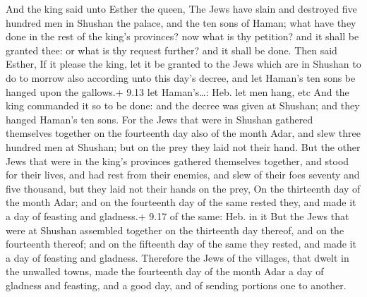  And the king said unto Esther the queen, The Jews have
slain and destroyed five hundred men in Shushan the palace, and the ten
sons of Haman; what have they done in the rest of the king's provinces?
now what is thy petition? and it shall be granted thee: or what is thy
request further? and it shall be done.  Then said Esther,
If it please the king, let it be granted to the Jews which are in
Shushan to do to morrow also according unto this day's decree, and let
Haman's ten sons be hanged upon the gallows.+ 9.13 let Haman's\ldots:
Heb. let men hang, etc  And the king commanded it so to be
done: and the decree was given at Shushan; and they hanged Haman's ten
sons.  For the Jews that were in Shushan gathered
themselves together on the fourteenth day also of the month Adar, and
slew three hundred men at Shushan; but on the prey they laid not their
hand.  But the other Jews that were in the king's provinces
gathered themselves together, and stood for their lives, and had rest
from their enemies, and slew of their foes seventy and five thousand,
but they laid not their hands on the prey,  On the
thirteenth day of the month Adar; and on the fourteenth day of the same
rested they, and made it a day of feasting and gladness.+ 9.17 of the
same: Heb. in it  But the Jews that were at Shushan
assembled together on the thirteenth day thereof, and on the fourteenth
thereof; and on the fifteenth day of the same they rested, and made it a
day of feasting and gladness.  Therefore the Jews of the
villages, that dwelt in the unwalled towns, made the fourteenth day of
the month Adar a day of gladness and feasting, and a good day, and of
sending portions one to another.

